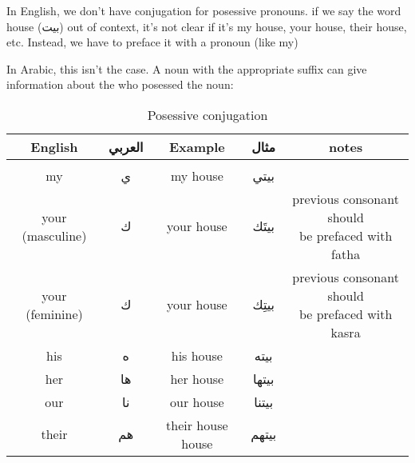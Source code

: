 \documentclass{article}
\begin{document}
In English, we don't have conjugation for posessive pronouns. if we say the word
house (\textarabic{بيت}) out of context, it's not clear if it's my house, your
house, their house, etc. Instead, we have to preface it with a pronoun (like my)

In Arabic, this isn't the case. A noun with the appropriate suffix can give 
information about the who posessed the noun:
\begin{table}[H]
    \caption{Posessive conjugation}
    \begin{center}
        \begin{tabular}{c c c c c}
            English         & \textarabic{العربي}& Example          & \textarabic{مثال} & notes\\
            \hline
            \\
            my              & \textarabic{ي}     & my house         & \textarabic{بيتي} & \\
            your (masculine)& \textarabic{ك}     & your house       & \textarabic{بيتَك}& \makecell{previous consonant should \\ be prefaced with fatha} \\
            your (feminine)& \textarabic{ك}     & your house       & \textarabic{بيتِك}& \makecell{previous consonant should \\ be prefaced with kasra} \\
            his             & \textarabic{ه}     & his house        & \textarabic{بيته} & \\
            her             & \textarabic{ها}    & her house        & \textarabic{بيتها}& \\
            our             & \textarabic{نا}    & our house        & \textarabic{بيتنا}& \\
            their           & \textarabic{هم}    & their house house& \textarabic{بيتهم}& \\
        \end{tabular}
    \end{center}
\end{table}
\end{document}
